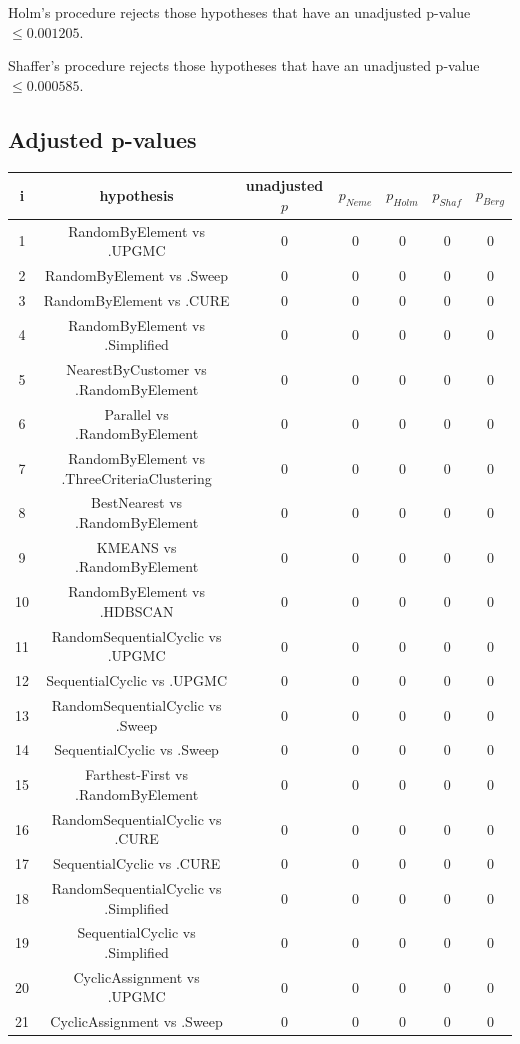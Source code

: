 \documentclass[a4paper,10pt]{article}
\begin{document}
\begin{landscape}
Holm's procedure rejects those hypotheses that have an unadjusted p-value $\le0.001205$.

Shaffer's procedure rejects those hypotheses that have an unadjusted p-value $\le0.000585$.

\pagebreak

\subsection{Adjusted p-values}

\begin{table}[!htp]
\centering\scriptsize
\begin{tabular}{ccccccc}
i&hypothesis&unadjusted $p$&$p_{Neme}$&$p_{Holm}$&$p_{Shaf}$&$p_{Berg}$\\
\hline1&RandomByElement vs .UPGMC&0&0&0&0&0\\
2&RandomByElement vs .Sweep&0&0&0&0&0\\
3&RandomByElement vs .CURE&0&0&0&0&0\\
4&RandomByElement vs .Simplified&0&0&0&0&0\\
5&NearestByCustomer vs .RandomByElement&0&0&0&0&0\\
6&Parallel vs .RandomByElement&0&0&0&0&0\\
7&RandomByElement vs .ThreeCriteriaClustering&0&0&0&0&0\\
8&BestNearest vs .RandomByElement&0&0&0&0&0\\
9&KMEANS vs .RandomByElement&0&0&0&0&0\\
10&RandomByElement vs .HDBSCAN&0&0&0&0&0\\
11&RandomSequentialCyclic vs .UPGMC&0&0&0&0&0\\
12&SequentialCyclic vs .UPGMC&0&0&0&0&0\\
13&RandomSequentialCyclic vs .Sweep&0&0&0&0&0\\
14&SequentialCyclic vs .Sweep&0&0&0&0&0\\
15&Farthest-First vs .RandomByElement&0&0&0&0&0\\
16&RandomSequentialCyclic vs .CURE&0&0&0&0&0\\
17&SequentialCyclic vs .CURE&0&0&0&0&0\\
18&RandomSequentialCyclic vs .Simplified&0&0&0&0&0\\
19&SequentialCyclic vs .Simplified&0&0&0&0&0\\
20&CyclicAssignment vs .UPGMC&0&0&0&0&0\\
21&CyclicAssignment vs .Sweep&0&0&0&0&0\\

\end{tabular}
\end{table}
\end{landscape}
\end{document}
